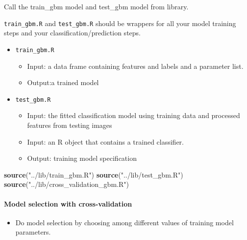 \documentclass[
]{article}
\newenvironment{Shaded}{\begin{snugshade}}{\end{snugshade}}
\newcommand{\KeywordTok}[1]{\textcolor[rgb]{0.13,0.29,0.53}{\textbf{#1}}}
\newcommand{\NormalTok}[1]{#1}
\newcommand{\StringTok}[1]{\textcolor[rgb]{0.31,0.60,0.02}{#1}}
\providecommand{\tightlist}{%
  \setlength{\itemsep}{0pt}\setlength{\parskip}{0pt}}
\begin{document}
Call the train\_gbm model and test\_gbm model from library.

\texttt{train\_gbm.R} and \texttt{test\_gbm.R} should be wrappers for
all your model training steps and your classification/prediction steps.

\begin{itemize}
\tightlist
\item
  \texttt{train\_gbm.R}

  \begin{itemize}
  \tightlist
  \item
    Input: a data frame containing features and labels and a parameter
    list.
  \item
    Output:a trained model
  \end{itemize}
\item
  \texttt{test\_gbm.R}

  \begin{itemize}
  \tightlist
  \item
    Input: the fitted classification model using training data and
    processed features from testing images
  \item
    Input: an R object that contains a trained classifier.
  \item
    Output: training model specification
  \end{itemize}
\end{itemize}

\begin{Shaded}
\begin{Highlighting}[]
\KeywordTok{source}\NormalTok{(}\StringTok{"../lib/train_gbm.R"}\NormalTok{) }
\KeywordTok{source}\NormalTok{(}\StringTok{"../lib/test_gbm.R"}\NormalTok{)}
\KeywordTok{source}\NormalTok{(}\StringTok{"../lib/cross_validation_gbm.R"}\NormalTok{)}
\end{Highlighting}
\end{Shaded}

\hypertarget{model-selection-with-cross-validation}{%
\paragraph{Model selection with
cross-validation}\label{model-selection-with-cross-validation}}

\begin{itemize}
\tightlist
\item
  Do model selection by choosing among different values of training
  model parameters.
\end{itemize}
\end{document}
